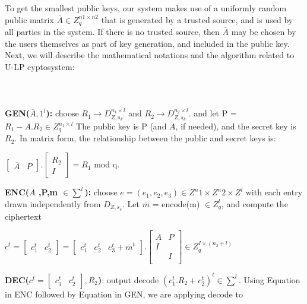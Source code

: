 \documentclass[conference]{IEEEtran}
\begin{document}
To get the smallest public keys, our system makes use of a uniformly random public matrix $\overline{A} \in Z^{n1×n2}_q$ that is generated by a trusted source, and is used by all parties in the system. If there is no trusted source, then $\overline{A}$ may be chosen by the users themselves as part of key generation, and included in the public key. Next, we will describe the mathematical notations and the algorithm related to U-LP cyptosystem:
\\
\\
\\
\\
\textbf{GEN($\overline{A} , 1^l$):} choose $R_1 \rightarrow D^{n_1 \times l}_{Z,s_k}$ and $R_2 \rightarrow D^{n_2 \times l}_{Z,s_k}$. and let P = $R_1 - \overline{A} . R_2 \in Z^{n_1 \times l}_{q}$ The public key is P (and $\overline{A}$, if needed), and the secret key is $R_2$. In matrix form, the relationship between the public and secret keys is:

\begin{center}
$\left[
\begin{array}{cc}
   \overline{A}  &  P
\end{array}
\right] .
\left[
\begin{array}{c}
   R_2  \\ 
   I
\end{array}
\right] = R_1$ mod q.
\end{center}

\textbf{ENC($\overline{A}$ ,P,m $\in \sum^l$):} choose $e = (e_1, e_2, e_3) \in Z^n1 \times Z^n2 \times Z^l$ with each entry drawn independently
from $D_{Z,s_e}$. Let $\overline{m}$ = encode(m) $\in Z^l_q$, and compute the ciphertext 

\begin{center}
$c^t = 
\left[
\begin{array}{cc}
   c^t_1 & c^t_2
\end{array}
\right] =
\left[
\begin{array}{ccc}
   e^t_1 & e^t_2 & e^t_3 + \overline{m}^t 
\end{array}
\right] .
\left[
\begin{array}{cc}
   \overline{A}  &  P \\
   I &   \\
     & I \\
\end{array}
\right]
\in Z^{I \times (n_2 + l)}_q$
\end{center}

\textbf{DEC($c^t = 
\left[
\begin{array}{cc}
   c^t_1 & c^t_2
\end{array}
\right],R_2$)}:
output decode ${(c_1^t . R_2 + c_2^t)}^t \in \sum^l$.
Using Equation in ENC followed by Equation in GEN, we are applying decode to
\end{document}
